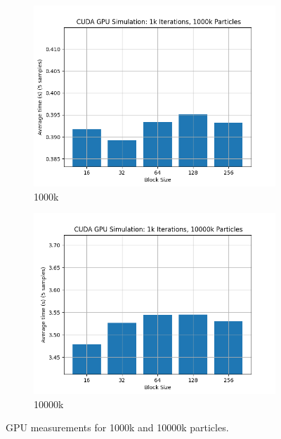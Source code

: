\documentclass[a4paper, 12pt]{article}
\begin{document}
\begin{figure}
    \centering
    \begin{subfigure}{.5\textwidth}
      \centering
      \includegraphics[width=1\linewidth]{graphs/ex_3_graph_gpu_1000k.png}
      \caption{1000k}
      \label{fig:ex-3-gpu-1000k}
    \end{subfigure}%
    \begin{subfigure}{.5\textwidth}
      \centering
      \includegraphics[width=1\linewidth]{graphs/ex_3_graph_gpu_10000k.png}
      \caption{10000k}
      \label{fig:ex-3-gpu-10000k}
    \end{subfigure}
    \caption{GPU measurements for 1000k and 10000k particles.}
    \label{fig:test}
\end{figure}
\end{document}
